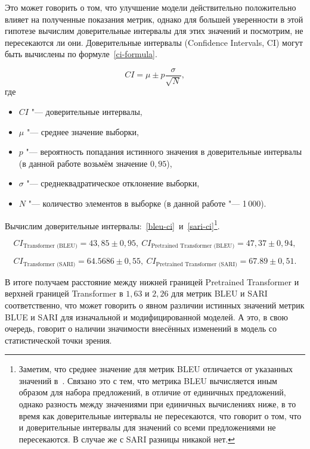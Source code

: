 Это может говорить о том, что улучшение модели действительно положительно влияет на полученные показания метрик, однако для большей уверенности в этой гипотезе вычислим доверительные интервалы для этих значений и посмотрим, не пересекаются ли они. Доверительные интервалы (Confidence Intervals, CI) могут быть вычислены по формуле~\eqref{ci-formula}.

\begin{equation}%
  \label{ci-formula}
  CI = \mu \pm p \frac{\sigma}{\sqrt{N}},
\end{equation}
где
\begin{itemize}%
  \item $CI$ "--- доверительные интервалы,
  \item $\mu$ "--- среднее значение выборки,
  \item $p$ "--- вероятность попадания истинного значения в доверительные интервалы (в данной работе возьмём значение $0{,}95$),
  \item $\sigma$ "--- среднеквадратическое отклонение выборки,
  \item $N$ "--- количество элементов в выборке (в данной работе "--- 1\,000).
\end{itemize}

Вычислим доверительные интервалы:~\eqref{bleu-ci}~и~\eqref{sari-ci}\footnote{Заметим, что среднее значение для метрик BLEU отличается от указанных значений в~. Связано это с тем, что метрика BLEU вычисляется иным образом для набора предложений, в отличие от единичных предложений, однако разность между значениями при единичных вычислениях ниже, в то время как доверительные интервалы не пересекаются, что говорит о том, что и доверительные интервалы для значений со всеми предложениями не пересекаются. В случае же с SARI разницы никакой нет.}.

\begin{equation}\label{bleu-ci}%
  CI_{\text{Transformer (BLEU)}} = 43{,}85 \pm 0{,}95, \
  CI_{\text{Pretrained Transformer (BLEU)}} = 47{,}37 \pm 0{,}94,
\end{equation}

\begin{equation}\label{sari-ci}%
  CI_{\text{Transformer (SARI)}} = 64.5686 \pm 0{,}55, \
  CI_{\text{Pretrained Transformer (SARI)}} = 67.89 \pm 0{,}51.
\end{equation}

В итоге получаем расстояние между нижней границей Pretrained Transformer и верхней границей Transformer в $1{,}63$ и $2{,}26$ для метрик BLEU и SARI соответственно, что может говорить о явном различии истинных значений метрик BLUE и SARI для изначальной и модифицированной моделей.
А это, в свою очередь, говорит о наличии значимости внесённых изменений в модель со статистической точки зрения.


